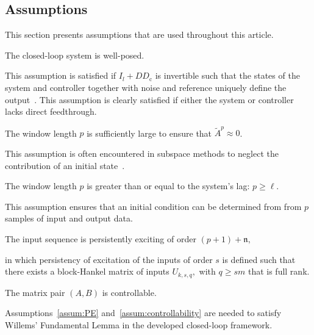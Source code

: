 \subsection{Assumptions}
This section presents assumptions that are used throughout this article.
\begin{assum}\label{assum:well_posed}
    The closed-loop system is well-posed.
\end{assum}
This assumption is satisfied if $I_l+DD_\mathrm{c}$ is invertible such that the states of the system and controller together with noise and reference uniquely define the output~\citep{VanOverschee1997}. This assumption is clearly satisfied if either the system or controller lacks direct feedthrough.
\begin{assum}\label{assum:initial_contribution}
    The window length $p$ is sufficiently large to ensure that $\tilde{A}^p\approx0$.
\end{assum}
This assumption is often encountered in subspace methods to neglect the contribution of an initial state~\citep{Chiuso2007}.
\begin{assum}\label{assum:unique_initial}
    The window length $p$ is greater than or equal to the system's lag: $p\geq\ell$.
\end{assum}
This assumption ensures that an initial condition can be determined from from $p$ samples of input and output data.
\begin{assum}\label{assum:PE}
    The input sequence is persistently exciting of order $(p+1)+\mathfrak{n},$
\end{assum}
in which persistency of excitation of the inputs of order $s$ is defined such that there exists a block-Hankel matrix of inputs $U_{k,s,q},$ with $q\geq sm$ that is full rank.
\begin{assum}\label{assum:controllability}
    The matrix pair $(A,B)$ is controllable.
\end{assum}
Assumptions~\ref{assum:PE} and~\ref{assum:controllability} are needed to satisfy Willems' Fundamental Lemma in the developed closed-loop framework.
